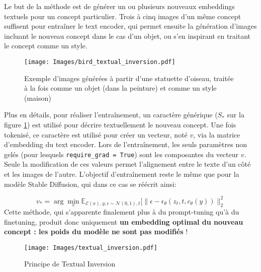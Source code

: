 \documentclass{article}
\begin{document}
Le but de la méthode est de générer un ou plusieurs nouveaux embeddings textuels pour un concept particulier. Trois à cinq images d'un même concept suffisent pour entraîner le text encoder, qui permet ensuite la génération d'images incluant le nouveau concept dans le cas d'un objet, ou s'en inspirant en traitant le concept comme un style. 
\begin{figure}[H]
    \centering
    \texttt{[image: Images/bird\_textual\_inversion.pdf]}
    \caption{Exemple d'images générées à partir d'une statuette d'oiseau, traitée à la fois comme un objet (dans la peinture) et comme un style (maison)}
\end{figure}

\begin{spacing}{1}
Plus en détails, pour réaliser l'entraînement, un caractère générique ($S_*$ sur la figure \ref{principe_ti}) est utilisé pour décrire textuellement le nouveau concept. Une fois tokenisé, ce caractère est utilisé pour créer un vecteur, noté $v$, via la matrice d'embedding du text encoder. Lors de l'entraînement, les seuls paramètres non gelés (pour lesquels \texttt{require\_grad = True}) sont les composantes du vecteur $v$. Seule la modification de ces valeurs permet l'alignement entre le texte d'un côté et les images de l'autre. L'objectif d'entraînement reste le même que pour la modèle Stable Diffusion, qui dans ce cas se réécrit ainsi:
\end{spacing}
\large
\vspace{-0.3cm}
$$ v_* = \arg \min_v \mathbb{E}_{\mathcal{E}(x), y, \epsilon \sim \mathcal{N}(0,1), t} [\lVert \epsilon - \epsilon_{\theta}(z_t, t, c_{\theta}(y)) \rVert_2^2$$
\normalsize
Cette méthode, qui s'apparente finalement plus à du prompt-tuning qu'à du finetuning, produit donc uniquement \textbf{un embedding optimal du nouveau concept : les poids du modèle ne sont pas modifiés} !

\begin{figure}[H]
    \centering
    \texttt{[image: Images/textual\_inversion.pdf]}
    \caption{Principe de Textual Inversion}
    \label{principe_ti}
\end{figure}
\end{document}
